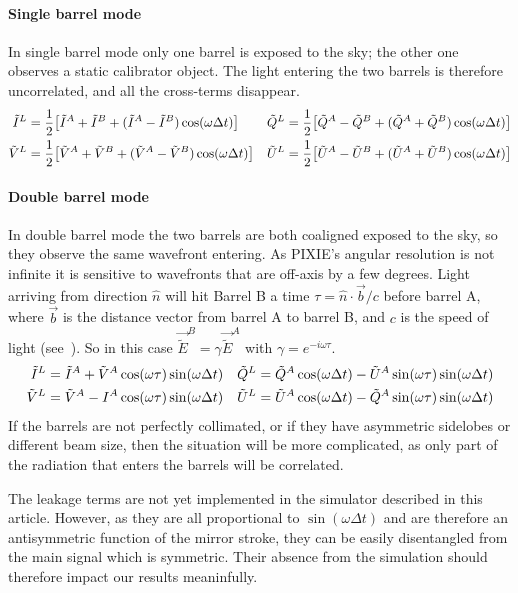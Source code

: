 \documentclass{article}
\newcommand{\I}{\tilde I}
\newcommand{\Q}{\tilde Q}
\newcommand{\U}{\tilde U}
\newcommand{\V}{\tilde V}
\newcommand{\J}{{\tilde E}}
\begin{document}
\paragraph{Single barrel mode}
In single barrel mode only one barrel is exposed to the sky; the other one
observes a static calibrator object. The light entering the two barrels is
therefore uncorrelated, and all the cross-terms disappear.
\begin{align}
	\I^L &= \frac12\big[\I^A+\I^B+(\I^A-\I^B)\cos(\omega\Delta t)\big] &
	\Q^L &= \frac12\big[\Q^A-\Q^B+(\Q^A+\Q^B)\cos(\omega\Delta t)\big] \notag \\
	\V^L &= \frac12\big[\V^A+\V^B+(\V^A-\V^B)\cos(\omega\Delta t)\big] &
	\U^L &= \frac12\big[\U^A-\U^B+(\U^A+\U^B)\cos(\omega\Delta t)\big] \label{eq:single}
\end{align}

\paragraph{Double barrel mode}
In double barrel mode the two barrels are both coaligned exposed to the sky,
so they observe the same wavefront entering. As PIXIE's angular resolution is
not infinite it is sensitive to wavefronts that are off-axis by a few degrees.
Light arriving from direction $\hat n$ will hit Barrel B a time
$\tau = \hat n \cdot \vec b / c$ before barrel A, where $\vec b$ is the distance vector from
barrel A to barrel B, and $c$ is the speed of light (see~\cite{pixie_array}).
So in this case $\vec \J^B = \gamma \vec\J^A$ with $\gamma = e^{-i\omega\tau}$.
\begin{align}
	\I^L &= \I^A+\V^A\cos(\omega\tau)\sin(\omega\Delta t) &
	\Q^L &= \Q^A\cos(\omega\Delta t)-\U^A\sin(\omega\tau)\sin(\omega\Delta t) \notag \\
	\V^L &= \V^A-I^A\cos(\omega\tau)\sin(\omega\Delta t) &
	\U^L &= \U^A\cos(\omega\Delta t)-\Q^A\sin(\omega\tau)\sin(\omega\Delta t) \label{eq:double}
\end{align}
If the barrels are not perfectly collimated, or if they have asymmetric sidelobes or different beam size,
then the situation will be more complicated, as only part of the radiation that
enters the barrels will be correlated.

The leakage terms are not yet implemented in the simulator described in this
article. However, as they are all proportional to $\sin(\omega\Delta t)$ and
are therefore an antisymmetric function of the mirror stroke, they can be
easily disentangled from the main signal which is symmetric. Their absence
from the simulation should therefore impact our results meaninfully.
\end{document}
